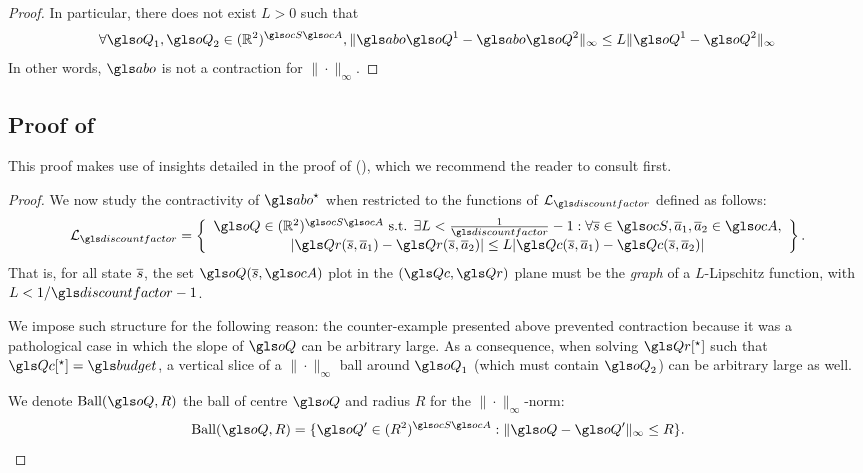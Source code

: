 \begin{subappendices}
\begin{proof}
	In particular, there does not exist $L>0$ such that
	$$\forall \oQ_1,\oQ_2\in(\Real^2)^{\ocS\ocA}, \|\abo \oQ^1 - \abo \oQ^2\|_\infty \leq L \|\oQ^1 - \oQ^2\|_\infty$$
	In other words, $\abo$ is not a contraction for $\|\cdot\|_\infty$.
\end{proof}

\subsection{Proof of }
\label{proof:contraction-with-smooth}

\begin{remark}
	\begin{leftbar}[remarkbar]
	This proof makes use of insights detailed in the proof of  (), which we recommend the reader to consult first.
	\end{leftbar}
\end{remark}

\begin{proof}
	We now study the contractivity of $\abo^{\star}$ when restricted to the functions of $\cL_{\discountfactor}$ defined as follows:
    \begin{equation}
    \cL_{\discountfactor} = \left\{\begin{array}{cc}
   \oQ\in(\Real^2)^{\ocS\ocA}\text{ s.t. }\exists L<\frac{1}{\discountfactor}-1: \forall \os\in\ocS,\oa_1,\oa_2\in\ocA,   \\
   |\Qr(\os,\oa_1) - \Qr(\os,\oa_2)| \leq L|\Qc(\os,\oa_1) - \Qc(\os,\oa_2)|
    \end{array}\right\}.
    \end{equation}
    That is, for all state $\overline{s}$, the set $\oQ(\os, \ocA)$ plot in the $(\Qc,\Qr)$ plane must be the \emph{graph} of a $L$-Lipschitz function, with $L<1/\discountfactor-1$.

    We impose such structure for the following reason: the counter-example presented above prevented contraction because it was a pathological case in which the slope of $\oQ$ can be arbitrary large. As a consequence, when solving $\Qr[^\star]$ such that $\Qc[^\star]=\budget$, a vertical slice of a $\|\cdot\|_\infty$ ball around $\oQ_1$ (which must contain $\oQ_2$) can be arbitrary large as well.


    We denote $\text{Ball}(\oQ,R)$ the ball of centre $\oQ$ and radius $R$ for the $\|\cdot\|_\infty$-norm:
    \begin{equation*}
        \text{Ball}(\oQ,R) = \{\oQ'\in(R^2)^{\ocS\ocA}: \|\oQ-\oQ'\|_\infty \leq R\}.
    \end{equation*}


\end{proof}
\end{subappendices}
